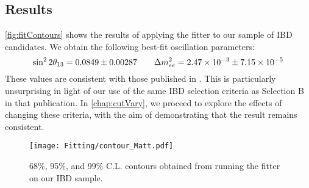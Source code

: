 \documentclass[../thesis.tex]{subfiles}
\begin{document}
\begin{comment}
Generate map of chi2 in oscillation parameter space. Take the 1sigma contour based on where the chi2 falls to XXX, etc.
\end{comment}

\subsection{Results}
\label{sec:fitResults}

\autoref{fig:fitContours} shows the results of applying the fitter to our sample of IBD candidates. We obtain the following best-fit oscillation parameters:
\begin{equation}
  \sin^2 2\theta_{13} = 0.0849 \pm 0.00287 \qquad \Delta m^2_{ee} = 2.47\times10^{-3} \pm 7.15\times10^{-5}
  \label{eq:fitResults}
\end{equation}
These values are consistent with those published in \cite{An_2017}. This is particularly unsurprising in light of our use of the same IBD selection criteria as Selection B in that publication. In \ref{chap:cutVary}, we proceed to explore the effects of changing these criteria, with the aim of demonstrating that the result remains consistent.

\begin{figure}[ht]
  \texttt{[image: Fitting/contour\_Matt.pdf]}
  \caption{68\%, 95\%, and 99\% C.L\@. contours obtained from running the fitter on our IBD sample.}
  \label{fig:fitContours}
\end{figure}
\end{document}

